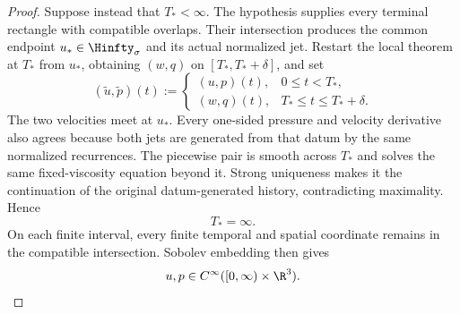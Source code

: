 \begin{proof}
Suppose instead that \(T_*<\infty\).  The hypothesis supplies every terminal
rectangle with compatible overlaps.  Their intersection produces the common
endpoint \(u_*\in\Hinfty_\sigma\) and its actual normalized jet.  Restart the
local theorem at \(T_*\) from \(u_*\), obtaining \((w,q)\) on
\([T_*,T_*+\delta]\), and set
\[
  (\widetilde u,\widetilde p)(t)
  :=
  \begin{cases}
    (u,p)(t),&0\leq t<T_*,\\
    (w,q)(t),&T_*\leq t\leq T_*+\delta.
  \end{cases}
\]
The two velocities meet at \(u_*\).  Every one-sided pressure and velocity
derivative also agrees because both jets are generated from that datum by the
same normalized recurrences.  The piecewise pair is smooth across \(T_*\) and
solves the same fixed-viscosity equation beyond it.  Strong uniqueness makes it
the continuation of the original datum-generated history, contradicting
maximality.  Hence
\[
  T_*=\infty.
\]
On each finite interval, every finite temporal and spatial coordinate remains in
the compatible intersection.  Sobolev embedding then gives
\[
  u,p\in C^\infty([0,\infty)\times\R^3).
\]
\end{proof}
